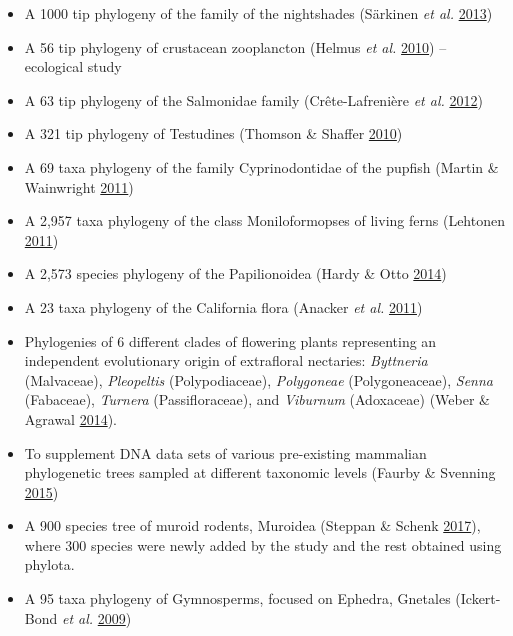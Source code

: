 \documentclass[]{article}
\providecommand{\tightlist}{%
  \setlength{\itemsep}{0pt}\setlength{\parskip}{0pt}}
\begin{document}
\begin{enumerate}
  \begin{itemize}
  \tightlist
  \item
    A 1000 tip phylogeny of the family of the nightshades (Särkinen \emph{et al.} \protect\hyperlink{ref-sarkinen2013solanaceae}{2013})
  \item
    A 56 tip phylogeny of crustacean zooplancton (Helmus \emph{et al.} \protect\hyperlink{ref-helmus2010communities}{2010}) -- ecological study
  \item
    A 63 tip phylogeny of the Salmonidae family (Crête-Lafrenière \emph{et al.} \protect\hyperlink{ref-crete2012salmonidae}{2012})
  \item
    A 321 tip phylogeny of Testudines (Thomson \& Shaffer \protect\hyperlink{ref-thomson2010sparse}{2010})
  \item
    A 69 taxa phylogeny of the family Cyprinodontidae of the pupfish (Martin \& Wainwright \protect\hyperlink{ref-martin2011trophic}{2011})
  \item
    A 2,957 taxa phylogeny of the class Moniloformopses of living ferns (Lehtonen \protect\hyperlink{ref-lehtonen2011towards}{2011})
  \item
    A 2,573 species phylogeny of the Papilionoidea (Hardy \& Otto \protect\hyperlink{ref-hardy2014specialization}{2014})
  \item
    A 23 taxa phylogeny of the California flora (Anacker \emph{et al.} \protect\hyperlink{ref-anacker2011origins}{2011})
  \item
    Phylogenies of 6 different clades of flowering plants representing an independent
    evolutionary origin of extrafloral nectaries: \emph{Byttneria} (Malvaceae), \emph{Pleopeltis} (Polypodiaceae),
    \emph{Polygoneae} (Polygoneaceae), \emph{Senna} (Fabaceae), \emph{Turnera} (Passifloraceae), and \emph{Viburnum}
    (Adoxaceae) (Weber \& Agrawal \protect\hyperlink{ref-weber2014defense}{2014}).
  \item
    To supplement DNA data sets of various pre-existing mammalian phylogenetic trees
    sampled at different taxonomic levels (Faurby \& Svenning \protect\hyperlink{ref-faurby2015species}{2015})
  \item
    A 900 species tree of muroid rodents, Muroidea (Steppan \& Schenk \protect\hyperlink{ref-steppan2017muroid}{2017}), where 300
    species were newly added by the study and the rest obtained using phylota.
  \item
    A 95 taxa phylogeny of Gymnosperms, focused on Ephedra, Gnetales (Ickert-Bond \emph{et al.} \protect\hyperlink{ref-ickert2009fossil}{2009})

\end{itemize}
\end{enumerate}
\end{document}
